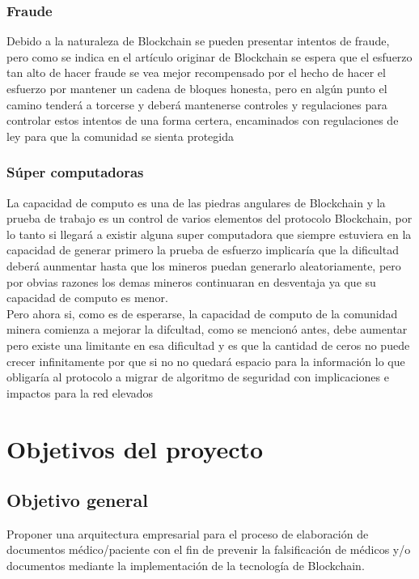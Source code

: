 \subsubsection{Fraude}
Debido a la naturaleza de Blockchain se pueden presentar intentos de fraude, pero como se indica en el artículo originar de Blockchain se espera que el esfuerzo tan alto de hacer fraude se vea mejor recompensado por el hecho de hacer el esfuerzo por mantener un cadena de bloques honesta\citep{nakamoto2009bitcoin}, pero en algún punto el camino tenderá a torcerse y deberá mantenerse controles y regulaciones para controlar estos intentos de una forma certera, encaminados con regulaciones de ley para que la comunidad se sienta protegida

\subsubsection{Súper computadoras}
La capacidad de computo es una de las piedras angulares de Blockchain y la prueba de trabajo es un control de varios elementos del protocolo Blockchain, por lo tanto si llegará a existir alguna super computadora que siempre estuviera en la capacidad de generar primero la prueba de esfuerzo implicaría que la dificultad \citep{nakamoto2009bitcoin} deberá aunmentar hasta que los mineros puedan generarlo aleatoriamente, pero por obvias razones los demas mineros continuaran en desventaja ya que su capacidad de computo es menor.
\\
Pero ahora si, como es de esperarse, la capacidad de computo de la comunidad minera comienza a mejorar la difcultad, como se mencionó antes, debe aumentar pero existe una limitante en esa dificultad y es que la cantidad de ceros no puede crecer infinitamente por que si no no quedará espacio para la información lo que obligaría al protocolo a migrar de algoritmo de seguridad con implicaciones e impactos para la red elevados\citep{crosby2016blockchain}


\section{Objetivos del proyecto}

\subsection{Objetivo general}
Proponer una arquitectura empresarial para el proceso de elaboración de documentos médico/paciente con el fin de prevenir la falsificación de médicos y/o documentos mediante la implementación de la tecnología de Blockchain. 

